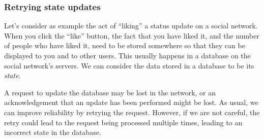 \begin{frame}
    \label{s:retry-increment}
    \frametitle{Retrying state updates}
    \begin{center}
    \end{center}%
\end{frame}
\label{l:retry-increment}

Let's consider as example the act of ``liking'' a status update on a social network.
When you click the ``like'' button, the fact that you have liked it, and the number of people who have liked it, need to be stored somewhere so that they can be displayed to you and to other users.
This usually happens in a database on the social network's servers.
We can consider the data stored in a database to be its \emph{state}.

A request to update the database may be lost in the network, or an acknowledgement that an update has been performed might be lost.
As usual, we can improve reliability by retrying the request.
However, if we are not careful, the retry could lead to the request being processed multiple times, leading to an incorrect state in the database.

